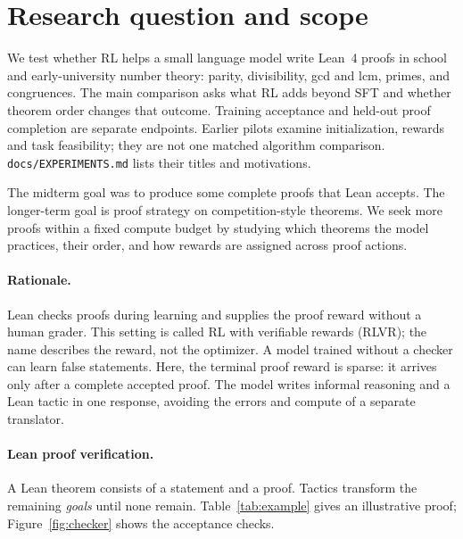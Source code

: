 \documentclass[11pt]{article}
\newcommand{\pth}[1]{\nolinkurl{#1}}
\begin{document}
\clearpage
\tableofcontents
\clearpage

\section{Research question and scope}
\label{sec:problem}

We test whether RL helps a small language model write Lean~4 proofs in school and early-university number theory: parity, divisibility, gcd and lcm, primes, and congruences.
The main comparison asks what RL adds beyond SFT and whether theorem order changes that outcome.
Training acceptance and held-out proof completion are separate endpoints.
Earlier pilots examine initialization, rewards and task feasibility; they are not one matched algorithm comparison.
\pth{docs/EXPERIMENTS.md} lists their titles and motivations.

The midterm goal was to produce some complete proofs that Lean accepts.
The longer-term goal is proof strategy on competition-style theorems.
We seek more proofs within a fixed compute budget by studying which theorems the model practices, their order, and how rewards are assigned across proof actions.

\paragraph{Rationale.}
Lean checks proofs during learning and supplies the proof reward without a human grader.
This setting is called RL with verifiable rewards (RLVR); the name describes the reward, not the optimizer.
A model trained without a checker can learn false statements.
Here, the terminal proof reward is sparse: it arrives only after a complete accepted proof.
The model writes informal reasoning and a Lean tactic in one response, avoiding the errors and compute of a separate translator.

\paragraph{Lean proof verification.}
A Lean theorem consists of a statement and a proof.
Tactics transform the remaining \emph{goals} until none remain.
Table~\ref{tab:example} gives an illustrative proof; Figure~\ref{fig:checker} shows the acceptance checks.
\end{document}
